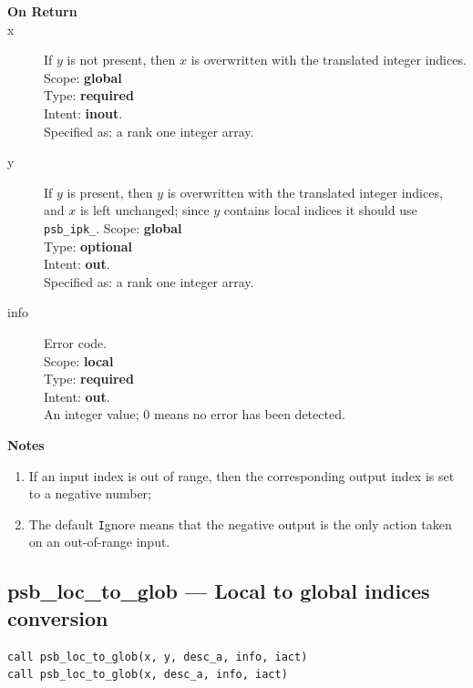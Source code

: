 \begin{description}
\item[\bf On Return]
\item[x] If $y$ is not present,
  then $x$ is overwritten with the translated integer indices. 
Scope: {\bf global} \\
Type: {\bf required}\\
Intent: {\bf inout}.\\
Specified as: a rank one integer array.
\item[y] If $y$ is  present,
  then $y$ is overwritten with the translated integer indices, and $x$
  is left unchanged; since $y$ contains local indices it should use  \verb|psb_ipk_|. 
Scope: {\bf global} \\
Type: {\bf optional}\\
Intent: {\bf out}.\\
Specified as: a rank one integer array.
\item[info] Error code.\\
Scope: {\bf local} \\
Type: {\bf required} \\
Intent: {\bf out}.\\
An integer value; 0 means no error has been detected. 
\end{description}

{\par\noindent\large\bfseries Notes}
\begin{enumerate}
\item If an input index is out of range, then the corresponding output
  index is set to a negative number;
\item The default \verb|I|gnore means that the negative output is the
  only action taken on an out-of-range input.
\end{enumerate}


\clearpage\subsection{psb\_loc\_to\_glob --- Local to global indices
  conversion}

\begin{verbatim}
call psb_loc_to_glob(x, y, desc_a, info, iact)
call psb_loc_to_glob(x, desc_a, info, iact)
\end{verbatim}

